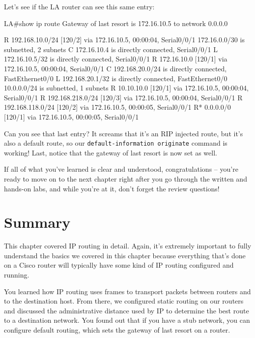 Let's see if the LA router can see this same entry:

\begin{cli}
LA#show ip route
Gateway of last resort is 172.16.10.5 to network 0.0.0.0

R    192.168.10.0/24 [120/2] via 172.16.10.5, 00:00:04, Serial0/0/1
     172.16.0.0/30 is subnetted, 2 subnets
C       172.16.10.4 is directly connected, Serial0/0/1
L       172.16.10.5/32 is directly connected, Serial0/0/1
R       172.16.10.0 [120/1] via 172.16.10.5, 00:00:04, Serial0/0/1
C    192.168.20.0/24 is directly connected, FastEthernet0/0
L    192.168.20.1/32 is directly connected, FastEthernet0/0
     10.0.0.0/24 is subnetted, 1 subnets
R       10.10.10.0 [120/1] via 172.16.10.5, 00:00:04, Serial0/0/1
R    192.168.218.0/24 [120/3] via 172.16.10.5, 00:00:04, Serial0/0/1
R    192.168.118.0/24 [120/2] via 172.16.10.5, 00:00:05, Serial0/0/1
R*   0.0.0.0/0 [120/1] via 172.16.10.5, 00:00:05, Serial0/0/1
\end{cli}

Can you see that last entry? It screams that it's an RIP injected route,
but it's also a default route, so our
\texttt{default-information\ originate} command is working! Last, notice
that the gateway of last resort is now set as well.

If all of what you've learned is clear and understood,
congratulations -- you're ready to move on to the next chapter right
after you go through the written and hands-on labs, and while you're at
it, don't forget the review questions!



\section{Summary}

This chapter covered IP routing in detail. Again, it's extremely
important to fully understand the basics we covered in this chapter
because everything that's done on a Cisco router will typically have
some kind of IP routing configured and running.

You learned how IP routing uses frames to transport packets between
routers and to the destination host. From there, we configured static
routing on our routers and discussed the administrative distance used by
IP to determine the best route to a destination network. You found out
that if you have a stub network, you can configure default routing,
which sets the gateway of last resort on a router.

